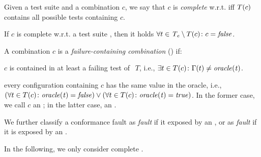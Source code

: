 \begin{tikzborder}{\cite{Gargantini16:validation}}
\begin{tikzborder}{\cite{gargantini_combinatorial_2017}}
\begin{tikzborder}{\cite{gargantini_combinatorial_2017}}
\begin{tikzborder}{\cite{garn2019}}
\begin{tikzborder}{\cite{arcaini2019achieving}}
\begin{tikzborder}{\cite{arcaini2019varivolution}}
		\begin{mydef}\label{def:combCompl}
			Given a test suite \testSuite and a combination $c$, we say that $c$ is \emph{complete} w.r.t. \testSuite iff $T(c)$ contains all possible tests containing $c$.
		\end{mydef}
		
		
		\begin{lemma}\label{lemma:combComplLemma}
			If $c$ is complete w.r.t. a test suite \testSuite, then it holds $\forall t \in \mathit{T_e} \setminus T(c) \colon c = \mathit{false}$.
		\end{lemma}
		
		\begin{mydef}\label{def:fcc}
			A combination $c$ is a \emph{failure-containing combination} (\fcc) if:
			\begin{compactenum}
				\item $c$ is contained in at least a failing test of $~~T$, i.e., $\exists t \in T(c) \colon \Gamma(t) \neq \mathit{oracle(t)}$.
				\item every configuration containing $c$ has the same value in the oracle, i.e., $(\forall t \in T(c) \colon \mathit{oracle(t)} = \mathit{false}) \vee (\forall t \in T(c) \colon \mathit{oracle(t)} = \mathit{true})$. In the former case, we call $c$ an \emph{\underConstr} \fcc; in the latter case, an \emph{\overConstr} \fcc.
			\end{compactenum}
			
			We further classify a conformance fault as \emph{\underConstr fault} if it exposed by an \underConstr \fcc, or as \emph{\overConstr fault} if it is exposed by an \overConstr \fcc.
		\end{mydef}
		
		In the following, we only consider complete \fccs.\be
		

\end{tikzborder}
\end{tikzborder}
\end{tikzborder}
\end{tikzborder}
\end{tikzborder}
\end{tikzborder}
